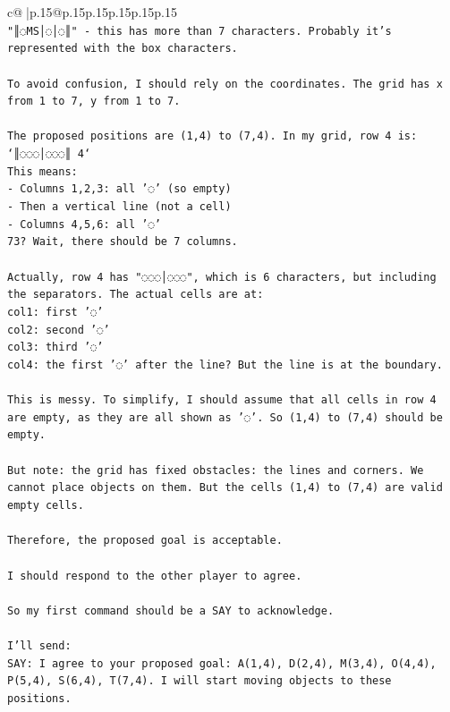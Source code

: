 \documentclass{article}
\begin{document}
{\begin{supertabular}{c@{$\;$}|p{.15\linewidth}@{}p{.15\linewidth}p{.15\linewidth}p{.15\linewidth}p{.15\linewidth}p{.15\linewidth}}
{{{\\ 
\texttt{"║◌MS│◌│◌║" {-} this has more than 7 characters. Probably it's represented with the box characters.} \\
\\ 
\texttt{To avoid confusion, I should rely on the coordinates. The grid has x from 1 to 7, y from 1 to 7.} \\
\\ 
\texttt{The proposed positions are (1,4) to (7,4). In my grid, row 4 is: `║◌◌◌│◌◌◌║ 4`} \\
\texttt{This means:} \\
\texttt{{-} Columns 1,2,3: all '◌' (so empty)} \\
\texttt{{-} Then a vertical line (not a cell)} \\
\texttt{{-} Columns 4,5,6: all '◌'} \\
\texttt{73? Wait, there should be 7 columns.} \\
\\ 
\texttt{Actually, row 4 has "◌◌◌│◌◌◌", which is 6 characters, but including the separators. The actual cells are at:} \\
\texttt{col1: first '◌'} \\
\texttt{col2: second '◌'} \\
\texttt{col3: third '◌'} \\
\texttt{col4: the first '◌' after the line? But the line is at the boundary.} \\
\\ 
\texttt{This is messy. To simplify, I should assume that all cells in row 4 are empty, as they are all shown as '◌'. So (1,4) to (7,4) should be empty.} \\
\\ 
\texttt{But note: the grid has fixed obstacles: the lines and corners. We cannot place objects on them. But the cells (1,4) to (7,4) are valid empty cells.} \\
\\ 
\texttt{Therefore, the proposed goal is acceptable.} \\
\\ 
\texttt{I should respond to the other player to agree.} \\
\\ 
\texttt{So my first command should be a SAY to acknowledge.} \\
\\ 
\texttt{I'll send:} \\
\texttt{SAY: I agree to your proposed goal: A(1,4), D(2,4), M(3,4), O(4,4), P(5,4), S(6,4), T(7,4). I will start moving objects to these positions.} \\
}}}
\end{supertabular}}
\end{document}
